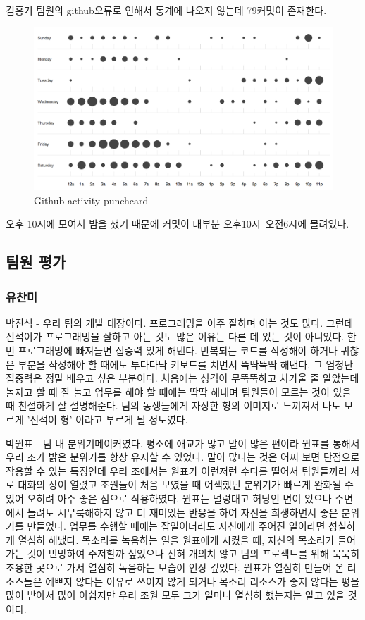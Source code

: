 \documentclass[10pt,oneside,a4paper,titlepage]{article}
\begin{document}
김홍기 팀원의 github오류로 인해서 통계에 나오지 않는데 79커밋이 존재한다. 

\begin{figure}[H]
\centering
\includegraphics[scale=0.8]{images/github2}
\caption{Github activity punchcard}
\end{figure}

오후 10시에 모여서 밤을 샜기 때문에 커밋이 대부분 오후10시~오전6시에 몰려있다.

\subsection{팀원 평가}

\subsubsection{유찬미}
박진석 - 우리 팀의 개발 대장이다. 프로그래밍을 아주 잘하며 아는 것도 많다. 그런데 진석이가 프로그래밍을 잘하고 아는 것도 많은 이유는 다른 데 있는 것이 아니었다. 한번 프로그래밍에 빠져들면 집중력 있게 해낸다. 반복되는 코드를 작성해야 하거나 귀찮은 부분을 작성해야 할 때에도 투다다닥 키보드를 치면서 뚝딱뚝딱 해낸다. 그 엄청난 집중력은 정말 배우고 싶은 부분이다.
처음에는 성격이 무뚝뚝하고 차가울 줄 알았는데 놀자고 할 때 잘 놀고 업무를 해야 할 때에는 딱딱 해내며 팀원들이 모르는 것이 있을 때 친절하게 잘 설명해준다. 팀의 동생들에게 자상한 형의 이미지로 느껴져서 나도 모르게 '진석이 형' 이라고 부르게 될 정도였다. 

박원표 - 팀 내 분위기메이커였다. 평소에 애교가 많고 말이 많은 편이라 원표를 통해서 우리 조가 밝은 분위기를 항상 유지할 수 있었다. 말이 많다는 것은 어찌 보면 단점으로 작용할 수 있는 특징인데 우리 조에서는 원표가 이런저런 수다를 떨어서 팀원들끼리 서로 대화의 장이 열렸고 조원들이 처음 모였을 때 어색했던 분위기가 빠르게 완화될 수 있어 오히려 아주 좋은 점으로 작용하였다. 원표는 덜렁대고 허당인 면이 있으나 주변에서 놀려도 시무룩해하지 않고 더 재미있는 반응을 하여 자신을 희생하면서 좋은 분위기를 만들었다.
업무를 수행할 때에는 잡일이더라도 자신에게 주어진 일이라면 성실하게 열심히 해냈다. 목소리를 녹음하는 일을 원표에게 시켰을 때, 자신의 목소리가 들어가는 것이 민망하여 주저할까 싶었으나 전혀 개의치 않고 팀의 프로젝트를 위해 묵묵히 조용한 곳으로 가서 열심히 녹음하는 모습이 인상 깊었다. 원표가 열심히 만들어 온 리소스들은 예쁘지 않다는 이유로 쓰이지 않게 되거나 목소리 리소스가 좋지 않다는 평을 많이 받아서 많이 아쉽지만 우리 조원 모두 그가 얼마나 열심히 했는지는 알고 있을 것이다.
\end{document}
